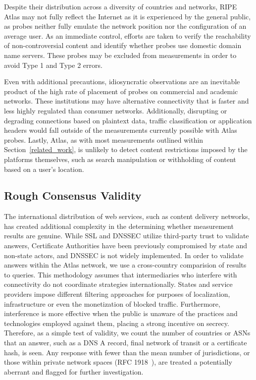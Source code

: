 Despite their distribution across a diversity of countries and networks,
RIPE Atlas may not fully reflect the Internet as it is experienced by
the general public, as probes neither fully emulate the network position
nor the configuration of an average user. As an immediate control,
efforts are taken to verify the reachability of non-controversial
content and identify whether probes use domestic domain name servers.
These probes may be excluded from measurements in order to avoid Type 1
and Type 2 errors.

Even with additional precautions, idiosyncratic observations are an
inevitable product of the high rate of placement of probes on commercial
and academic networks. These institutions may have alternative
connectivity that is faster and less highly regulated than consumer
networks. Additionally, disrupting or degrading connections based on
plaintext data, traffic classification or application headers would fall
outside of the measurements currently possible with Atlas probes.
Lastly, Atlas, as with most measurements outlined within
Section~\ref{related_work}, is unlikely to detect content restrictions
imposed by the platforms themselves, such as search manipulation or 
withholding of content based on a user's location.

\subsection{Rough Consensus Validity}

The international distribution of web services, such as content delivery
networks, has created additional complexity in the determining whether
measurement results are genuine. While SSL and DNSSEC utilize
third-party trust to validate answers, Certificate Authorities have been
previously compromised by state and non-state actors, and DNSSEC is not
widely implemented. In order to validate answers within the Atlas
network, we use a cross-country comparision of results to queries. This
methodology assumes that intermediaries who interfere with connectivity
do not coordinate strategies internationally. States and service
providers impose different filtering approaches for purposes of
localization, infrastructure or even the monetization of blocked
traffic. Furthermore, interference is more effective when the public is
unaware of the practices and technologies employed against them, placing
a strong incentive on secrecy. Therefore, as a simple test of validity,
we count the number of countries or ASNs that an answer, such as a DNS A
record, final network of transit or a certificate hash, is seen. Any
response with fewer than the mean number of jurisdictions, or those
within private network spaces (RFC 1918~\cite{rfc1918}), are treated a
potentially aberrant and flagged for further investigation.

